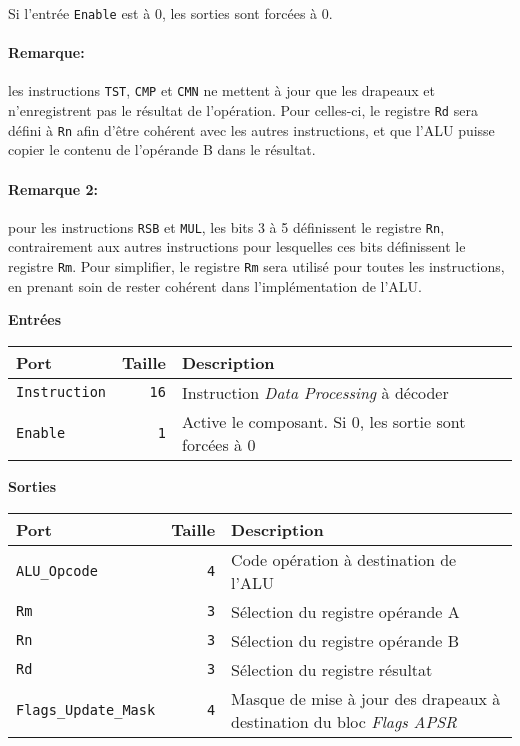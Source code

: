 Si l'entrée \texttt{Enable} est à 0, les sorties sont forcées à 0.

\paragraph{Remarque:} les instructions \texttt{TST}, \texttt{CMP} et \texttt{CMN} ne mettent à jour que les drapeaux et n'enregistrent pas le résultat de l'opération.
Pour celles-ci, le registre \texttt{Rd} sera défini à \texttt{Rn} afin d'être cohérent avec les autres instructions, et que l'ALU puisse copier le contenu de l'opérande B dans le résultat.


\paragraph{Remarque 2:} pour les instructions \texttt{RSB} et \texttt{MUL}, les bits 3 à 5 définissent le registre \texttt{Rn}, contrairement aux autres instructions pour lesquelles ces bits définissent le registre \texttt{Rm}.
Pour simplifier, le registre \texttt{Rm} sera utilisé pour toutes les instructions, en prenant soin de rester cohérent dans l'implémentation de l'ALU.



\textbf{Entrées}\\

\begin{tabular}{|l|r|l|}
\hline
\textbf{Port}		& \textbf{Taille} & \textbf{Description}\\
\hline

\texttt{Instruction}	& \texttt{16} & Instruction \textit{Data Processing} à décoder\\
\hline
\texttt{Enable}		&  \texttt{1} & Active le composant. Si 0, les sortie sont forcées à 0\\


\hline
\end{tabular}

\vspace{1em}
\textbf{Sorties}\\

\begin{tabular}{|l|r|l|}
\hline 
\textbf{Port} & \textbf{Taille} & \textbf{Description}\\
\hline

\texttt{ALU\_Opcode}		&  \texttt{4} & Code opération à destination de l'ALU\\
\hline
\texttt{Rm}			&  \texttt{3} & Sélection du registre opérande A\\
\hline
\texttt{Rn}			&  \texttt{3} & Sélection du registre opérande B\\
\hline
\texttt{Rd}			&  \texttt{3} & Sélection du registre résultat\\
\hline
\texttt{Flags\_Update\_Mask}	&  \texttt{4} & Masque de mise à jour des drapeaux à destination du bloc \textit{Flags APSR}\\

\hline
\end{tabular}




